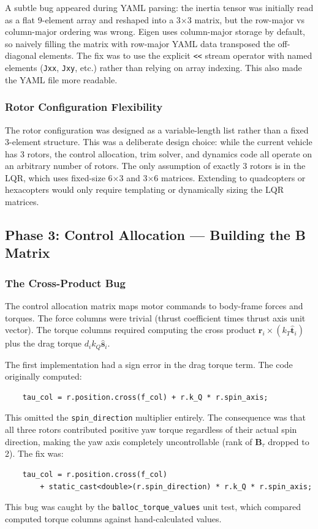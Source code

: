 \documentclass[12pt, a4paper]{article}
\newcommand{\bB}{\bm{B}}
\begin{document}
A subtle bug appeared during YAML parsing: the inertia tensor was initially read as a flat 9-element array and reshaped into a 3$\times$3 matrix, but the row-major vs column-major ordering was wrong.  Eigen uses column-major storage by default, so naively filling the matrix with row-major YAML data transposed the off-diagonal elements.  The fix was to use the explicit \texttt{<<} stream operator with named elements (\texttt{Jxx}, \texttt{Jxy}, etc.) rather than relying on array indexing.  This also made the YAML file more readable.

\subsubsection{Rotor Configuration Flexibility}

The rotor configuration was designed as a variable-length list rather than a fixed 3-element structure.  This was a deliberate design choice: while the current vehicle has 3 rotors, the control allocation, trim solver, and dynamics code all operate on an arbitrary number of rotors.  The only assumption of exactly 3 rotors is in the LQR, which uses fixed-size 6$\times$3 and 3$\times$6 matrices.  Extending to quadcopters or hexacopters would only require templating or dynamically sizing the LQR matrices.

\subsection{Phase 3: Control Allocation --- Building the B Matrix}

\subsubsection{The Cross-Product Bug}

The control allocation matrix maps motor commands to body-frame forces and torques.  The force columns were trivial (thrust coefficient times thrust axis unit vector).  The torque columns required computing the cross product $\bm{r}_i \times (k_T \hat{\bm{t}}_i)$ plus the drag torque $d_i k_Q \hat{\bm{s}}_i$.

The first implementation had a sign error in the drag torque term.  The code originally computed:
\begin{verbatim}
    tau_col = r.position.cross(f_col) + r.k_Q * r.spin_axis;
\end{verbatim}
This omitted the \texttt{spin\_direction} multiplier entirely.  The consequence was that all three rotors contributed positive yaw torque regardless of their actual spin direction, making the yaw axis completely uncontrollable (rank of $\bB_\tau$ dropped to 2).  The fix was:
\begin{verbatim}
    tau_col = r.position.cross(f_col)
        + static_cast<double>(r.spin_direction) * r.k_Q * r.spin_axis;
\end{verbatim}
This bug was caught by the \texttt{balloc\_torque\_values} unit test, which compared computed torque columns against hand-calculated values.
\end{document}
